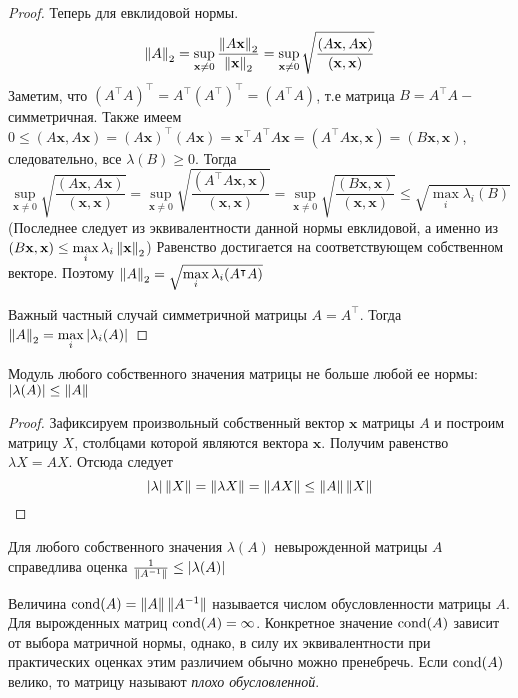 \begin{theorem}
\begin{proof}
    Теперь для евклидовой нормы.
    $$
      \left\lVert A\right\rVert_2 =
      \sup_{\mathbf{x} \neq 0} \frac{\left\lVert A \mathbf{x}\right\rVert_2}{\left\lVert\mathbf{x}\right\rVert_{2}} =
      \sup_{\mathbf{x} \neq 0} \sqrt{\frac{(A\mathbf{x}, A\mathbf{x})}{(\mathbf{x}, \mathbf{x})}}
    $$
    Заметим, что $(A^\intercal A)^\intercal = A^\intercal (A^\intercal)^\intercal = (A^\intercal A)$, т.е матрица $B = A^\intercal A - $ симметричная. Также имеем $ 0 \le (A\mathbf{x}, A\mathbf{x}) = (A\mathbf{x})^\intercal (A\mathbf{x}) = \mathbf{x}^\intercal A^\intercal A \mathbf{x} = (A^\intercal A \mathbf{x}, \mathbf{x}) = (B\mathbf{x}, \mathbf{x})$, следовательно, все $\lambda(B) \ge 0$. Тогда
    $$
      \sup_{\mathbf{x} \neq 0} \sqrt{\frac{(A\mathbf{x}, A\mathbf{x})}{(\mathbf{x}, \mathbf{x})}} =
      \sup_{\mathbf{x} \neq 0} \sqrt{\frac{(A^\intercal A\mathbf{x}, \mathbf{x})}{(\mathbf{x}, \mathbf{x})}} =
      \sup_{\mathbf{x} \neq 0} \sqrt{\frac{(B\mathbf{x}, \mathbf{x})}{(\mathbf{x}, \mathbf{x})}} \le \sqrt{\max_i \lambda_i(B)}
    $$
    (Последнее следует из эквивалентности данной нормы евклидовой, а именно из $(B\mathbf{x}, \mathbf{x}) \le \max\limits_i \lambda_i \left\lVert\mathbf{x}\right\rVert_{2}$)
    Равенство достигается на соответствующем собственном векторе. Поэтому $\left\lVert A\right\rVert_2 = \sqrt{\max\limits_i \lambda_i(A^\intercal A)}$

    Важный частный случай симметричной матрицы $A = A^\intercal$. Тогда $\left\lVert A\right\rVert_2 = \max\limits_i\left\lvert\lambda_i(A)\right\rvert$
  \end{proof}
\end{theorem}

\begin{theorem}
  Модуль любого собственного значения матрицы не больше любой ее нормы: $\left\lvert\lambda(A)\right\rvert \le \left\lVert A\right\rVert$

  \begin{proof}
    Зафиксируем произвольный собственный вектор $\mathbf{x}$ матрицы $A$ и построим матрицу $X$, столбцами которой являются вектора $\mathbf{x}$. Получим равенство $\lambda X = AX$. Отсюда следует
    $$
      \left\lvert\lambda\right\rvert \left\lVert X\right\rVert = \left\lVert\lambda X\right\rVert = \left\lVert AX\right\rVert \le \left\lVert A\right\rVert \left\lVert X\right\rVert
    $$
  \end{proof}
\end{theorem}

\begin{corollary}
  Для любого собственного значения $\lambda(A)$ невырожденной матрицы $A$ справедлива оценка $\frac{1}{\left\lVert A^{-1}\right\rVert} \le \left\lvert\lambda(A)\right\rvert$
\end{corollary}

\begin{definition}
  Величина $\operatorname{cond}(A) = \left\lVert A\right\rVert\lVert A^{-1} \rVert$ называется числом обусловленности матрицы $A$. Для вырожденных матриц $\operatorname{cond}(A) = \infty$. Конкретное значение $\operatorname{cond}(A)$ зависит от выбора матричной нормы, однако, в силу их эквивалентности при практических оценках этим различием обычно можно пренебречь. Если $\operatorname{cond}(A)$ велико, то матрицу называют \textit{плохо обусловленной}.
\end{definition}

